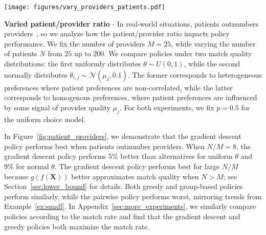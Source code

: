 \begin{example}
\label{ex:patient_provider}
\begin{figure*}
    \centering 
    \texttt{[image: figures/vary\_providers\_patients.pdf]}
    \caption{When there are more patients than providers, the gradient descent policy performs best, both for uniformly and normally distributed $\theta$.}
    \label{fig:patient_providers}
\end{figure*}

\textbf{Varied patient/provider ratio} - 
In real-world situations, patients outnumbers providers~\citep{healthcare_shortage}, so we analyze how the patient/provider ratio impacts policy performance. 
We fix the number of providers $M=25$, while varying the number of patients $N$ from $25$ up to $200$. 
We compare policies under two match quality distributions: the first uniformly distributes $\theta \sim U(0,1)$, while the second normally distributes $\theta_{i,j} \sim \mathcal{N}(\mu_{j},0.1)$. 
The former corresponds to heterogeneous preferences where patient preferences are non-correlated, while the latter corresponds to homogenous preferences, where patient preferences are influenced by some signal of provider quality $\mu_{j}$. 
For both experiments, we fix $p=0.5$ for the uniform choice model. 

In Figure~\ref{fig:patient_providers}, we demonstrate that the gradient descent policy performs best when patients outnumber providers. 
When $N/M=8$, the gradient descent policy performs 5\% better than alternatives for uniform $\theta$ and 9\% for normal $\theta$. 
The gradient descent policy performs best for large $N/M$ because $g(f(\mathbf{X}))$ better approximates match quality when $N>M$; see Section~\ref{sec:lower_bound} for details.
Both greedy and group-based policies perform similarly, while the pairwise policy performs worst, mirroring trends from Example~\ref{ex:small}. 
In Appendix~\ref{sec:more_experiments}, we similarly compare policies according to the match rate and find that the gradient descent and greedy policies both maximize the match rate. 
\end{example}

